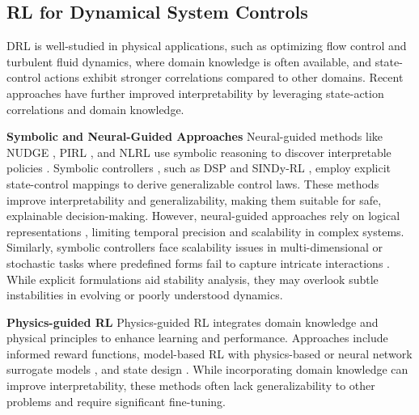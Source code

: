 \subsection{RL for Dynamical System Controls}
DRL is well-studied in physical applications, such as optimizing flow control and turbulent fluid dynamics, where domain knowledge is often available, and state-control actions exhibit stronger correlations compared to other domains\cite{yousif2023physics, weiner2024model, garnier2021review, rabault2019artificial}. Recent approaches have further improved interpretability by leveraging state-action correlations and domain knowledge.

\textbf{Symbolic and Neural-Guided Approaches} 
Neural-guided methods like NUDGE \cite{delfosse2024interpretable}, PIRL \cite{verma2018programmatically}, and NLRL \cite{jiang2019neural} use symbolic reasoning to discover interpretable policies \cite{jin2022creativity}. Symbolic controllers \cite{khaled2022framework, reissig2018symbolic}, such as DSP \cite{landajuela2021discovering} and SINDy-RL \cite{zolman2024sindy}, employ explicit state-control mappings to derive generalizable control laws.
These methods improve interpretability and generalizability, making them suitable for safe, explainable decision-making. However, neural-guided approaches rely on logical representations \cite{delfosse2024interpretable}, limiting temporal precision and scalability in complex systems. Similarly, symbolic controllers face scalability issues in multi-dimensional or stochastic tasks where predefined forms fail to capture intricate interactions \cite{landajuela2021discovering}. While explicit formulations aid stability analysis, they may overlook subtle instabilities in evolving or poorly understood dynamics.

\textbf{Physics-guided RL}
Physics-guided RL \cite{liu2021physics, banerjee2023survey, alam2021physics, jurj2021increasing, cho2019physics, wang2022toward} integrates domain knowledge and physical principles to enhance learning and performance. Approaches include informed reward functions, model-based RL with physics-based or neural network surrogate models \cite{hernandez2023port, nousiainen2021adaptive}, and state design \cite{banerjee2023survey}. While incorporating domain knowledge can improve interpretability, these methods \cite{alam2021physics, jurj2021increasing, cho2019physics, wang2022toward} often lack generalizability to other problems and require significant fine-tuning.


